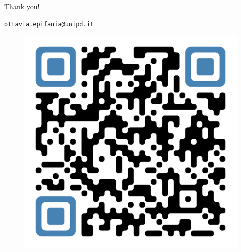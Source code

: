\documentclass{beamer} %
\begin{document}
\begin{frame}[plain]
	\vspace{2cm}
	\begin{center}
		\large{Thank you!}
		
		\vspace{3mm}
		\texttt{ottavia.epifania@unipd.it}
		
	\begin{figure}
		\centering
		\includegraphics[width=0.4\linewidth]{img/codeSlide}
	\end{figure}
	
	
	\end{center}
\end{frame}
\end{document}
